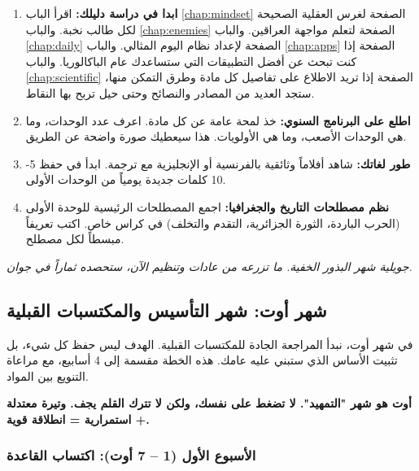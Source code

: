 \documentclass[12pt,a4paper]{book}
\newcommand{\quoteAr}[1]{%
	\begin{myquote}
		\itshape #1
	\end{myquote}
}
\newcommand{\importantAr}[1]{%
	\begin{important}
		\bfseries #1
	\end{important}
}
\begin{document}
	
	\begin{enumerate}
		\item \textbf{ابدا في دراسة دليلك:} 	اقرأ الباب  \ref{chap:mindset} الصفحة \pageref{chap:mindset} لغرس العقلية الصحيحة لكل طالب نخبة. والباب  \ref{chap:enemies} الصفحة \pageref{chap:enemies}  لتعلم مواجهة العراقين. والباب  \ref{chap:daily} الصفحة \pageref{chap:daily} لإعداد نظام اليوم المثالي. والباب  \ref{chap:apps} الصفحة \pageref{chap:apps} إذا كنت تبحث عن أفضل التطبيقات التي ستساعدك عام الباكالوريا. والباب  \ref{chap:scientific} الصفحة \pageref{chap:scientific} إذا تريد الاطلاع على تفاصيل كل مادة وطرق التمكن منها، ستجد العديد من المصادر والنصائح وحتى حيل تربح بها النقاط.
		
		\item \textbf{اطلع على البرنامج السنوي:} خذ لمحة عامة عن كل مادة. اعرف عدد الوحدات، وما هي الوحدات الأصعب، وما هي الأولويات. هذا سيعطيك صورة واضحة عن الطريق.
		\item \textbf{طور لغاتك:} شاهد أفلاماً وثائقية بالفرنسية أو الإنجليزية مع ترجمة. ابدأ في حفظ 5-10 كلمات جديدة يومياً من الوحدات الأولى.
		\item \textbf{نظم مصطلحات التاريخ والجغرافيا:} اجمع المصطلحات الرئيسية للوحدة الأولى (الحرب الباردة، الثورة الجزائرية، التقدم والتخلف) في كراس خاص. اكتب تعريفاً مبسطاً لكل مصطلح.
	\end{enumerate}
	
	\quoteAr{جويلية شهر البذور الخفية. ما تزرعه من عادات وتنظيم الآن، ستحصده ثماراً في جوان.}
	
	\subsection{شهر أوت: شهر التأسيس والمكتسبات القبلية}
	
	في شهر أوت، نبدأ المراجعة الجادة للمكتسبات القبلية. الهدف ليس حفظ كل شيء، بل تثبيت الأساس الذي ستبني عليه عامك. هذه الخطة مقسمة إلى 4 أسابيع، مع مراعاة التنويع بين المواد.
	
	\importantAr{أوت هو شهر "التمهيد". لا تضغط على نفسك، ولكن لا تترك القلم يجف. وتيرة معتدلة + استمرارية = انطلاقة قوية.}
	
	\subsubsection{الأسبوع الأول (1 – 7 أوت): اكتساب القاعدة}
	
\end{document}
